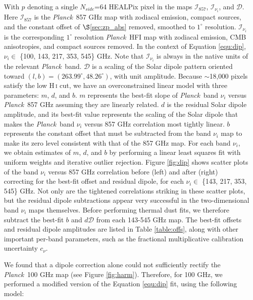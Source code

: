 \documentclass{emulateapj}
\newcommand{\PLANCK}{{\it Planck}}
\begin{document}
With $p$ denoting a single $N_{side}$=64 HEALPix pixel \citep{healpix} in the 
maps $\mathcal{I}_{857}$, $\mathcal{I}_{\nu_i}$, and $\mathcal{D}$. Here 
$\mathcal{I}_{857}$ is the \PLANCK~857 GHz map with zodiacal emission, compact 
sources, and the constant offset of $\S$\ref{sec:zp_abs} removed, smoothed to 
$1^{\circ}$ resolution. $\mathcal{I}_{\nu_i}$ is the corresponding $1^{\circ}$ 
resolution \PLANCK~HFI map with zodiacal emission, CMB anisotropies, and
compact sources removed. In the context of Equation \ref{equ:dip}, $\nu_i \in$ 
\{100, 143, 217, 353, 545\} GHz. Note that $\mathcal{I}_{\nu_i}$ is always in
the native units of the relevant \PLANCK~band. $\mathcal{D}$ is a scaling of 
the Solar dipole pattern oriented toward 
$(l, b) = (263.99^{\circ}, 48.26^{\circ})$, with unit amplitude. Because 
$\sim$18,000 pixels satisfy the low H\,\textsc{i} cut, we have an 
overconstrained linear model with three parameters: $m$, $d$, and $b$. $m$ 
represents the best-fit slope of \PLANCK~band $\nu_i$ versus \PLANCK~857 GHz 
assuming they are linearly related. $d$ is the residual Solar dipole amplitude,
and its best-fit value represents the scaling of the Solar dipole that makes 
the \PLANCK~band $\nu_i$ versus 857 GHz correlation most tightly linear. $b$ 
represents the constant offset that must be subtracted from the band $\nu_i$ 
map to make its zero level consistent with that of the 857 GHz map. For each 
band $\nu_i$, we obtain estimates of $m$, $d$, and $b$ by performing a linear 
least squares fit with uniform weights and iterative outlier rejection. Figure 
\ref{fig:dip} shows scatter plots of the band $\nu_i$ versus 857 GHz 
correlation before (left) and after (right) correcting for the best-fit offset 
and residual dipole, for each $\nu_i \in$ \{143, 217, 353, 545\} GHz. Not only 
are the tightened correlations striking in these scatter plots, but the 
residual dipole subtractions appear very successful in the two-dimensional band
$\nu_i$ maps themselves. Before performing thermal dust fits, we therefore 
subtract the best-fit $b$ and $d\mathcal{D}$ from each 143-545 GHz map. The 
best-fit offsets and residual dipole amplitudes are listed in Table 
\ref{table:offs}, along with other important per-band parameters, such as the 
fractional multiplicative calibration uncertainty $c_{\nu}$.

We found that a dipole correction alone could not sufficiently rectify the 
\PLANCK~100 GHz map (see Figure \ref{fig:harm}). Therefore, for 100 GHz, we 
performed a modified version of the Equation \ref{equ:dip} fit, using the 
following model:
\end{document}
